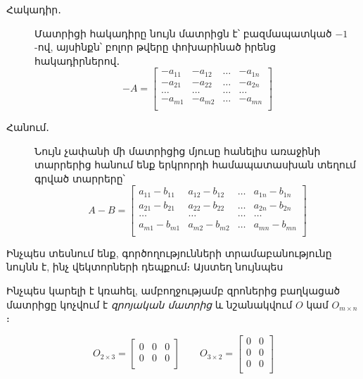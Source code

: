 \begin{description}
\item[Հակադիր․] Մատրիցի հակադիրը նույն մատրիցն է՝ բազմապատկած $-1$-ով, այսինքն՝ բոլոր թվերը փոխարինած իրենց հակադիրներով․
\[
  -A = \begin{bmatrix}
    -a_{11} & -a_{12} & \ldots & -a_{1n} \\
    -a_{21} & -a_{22} & \ldots & -a_{2n} \\
    \ldots & \ldots & \ldots & \ldots \\
    -a_{m1} & -a_{m2} & \ldots & -a_{mn} \\
  \end{bmatrix}
\]

\item[Հանում․]  Նույն չափանի մի մատրիցից մյուսը հանելիս առաջինի տարրերից հանում ենք երկրորդի համապատասխան տեղում գրված տարրերը՝
\[
  A - B = \begin{bmatrix}
    a_{11} - b_{11} & a_{12} - b_{12} & \ldots & a_{1n} - b_{1n} \\
    a_{21} - b_{21} & a_{22} - b_{22} & \ldots & a_{2n} - b_{2n} \\
     \ldots & \ldots & \ldots & \ldots \\
    a_{m1} - b_{m1} & a_{m2} - b_{m2} & \ldots & a_{mn} - b_{mn} \\
  \end{bmatrix}
\]
\end{description}

Ինչպես տեսնում ենք, գործողությունների տրամաբանությունը նույնն է, ինչ վեկտորների դեպքում։ Այստեղ նույնպես


Ինչպես կարելի է կռահել, ամբողջությամբ զրոներից բաղկացած մատրիցը կոչվում է \textit{զրոյական մատրից} և նշանակվում $O$ կամ $O_{m \times n}$։

\begin{example}
\[
  O_{2 \times 3} = \begin{bmatrix}
    0 & 0 & 0 \\
    0 & 0 & 0 \\
  \end{bmatrix}
  \qquad
  O_{3 \times 2} = \begin{bmatrix}
    0 & 0 \\
    0 & 0 \\
    0 & 0 \\
  \end{bmatrix}
\]
\end{example}

